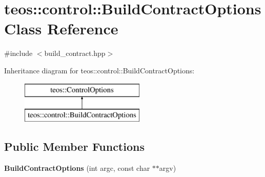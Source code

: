 \hypertarget{classteos_1_1control_1_1_build_contract_options}{}\section{teos\+:\+:control\+:\+:Build\+Contract\+Options Class Reference}
\label{classteos_1_1control_1_1_build_contract_options}


{\ttfamily \#include $<$build\+\_\+contract.\+hpp$>$}

Inheritance diagram for teos\+:\+:control\+:\+:Build\+Contract\+Options\+:\begin{figure}[H]
\begin{center}
\leavevmode
\includegraphics[height=2.000000cm]{classteos_1_1control_1_1_build_contract_options}
\end{center}
\end{figure}
\subsection*{Public Member Functions}
\begin{DoxyCompactItemize}
\item 
\mbox{\label{classteos_1_1control_1_1_build_contract_options_a6d52cf1de31d636a9e823b46c7302834}} 
{\bfseries Build\+Contract\+Options} (int argc, const char $\ast$$\ast$argv)
\end{DoxyCompactItemize}
